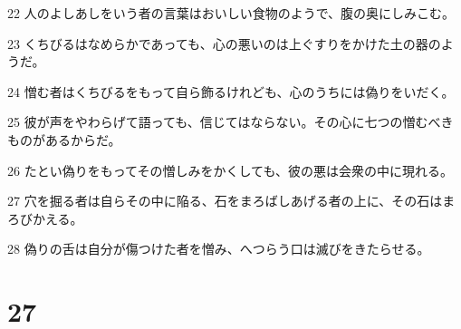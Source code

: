 \par 22 人のよしあしをいう者の言葉はおいしい食物のようで、腹の奥にしみこむ。
\par 23 くちびるはなめらかであっても、心の悪いのは上ぐすりをかけた土の器のようだ。
\par 24 憎む者はくちびるをもって自ら飾るけれども、心のうちには偽りをいだく。
\par 25 彼が声をやわらげて語っても、信じてはならない。その心に七つの憎むべきものがあるからだ。
\par 26 たとい偽りをもってその憎しみをかくしても、彼の悪は会衆の中に現れる。
\par 27 穴を掘る者は自らその中に陥る、石をまろばしあげる者の上に、その石はまろびかえる。
\par 28 偽りの舌は自分が傷つけた者を憎み、へつらう口は滅びをきたらせる。

\chapter{27}

